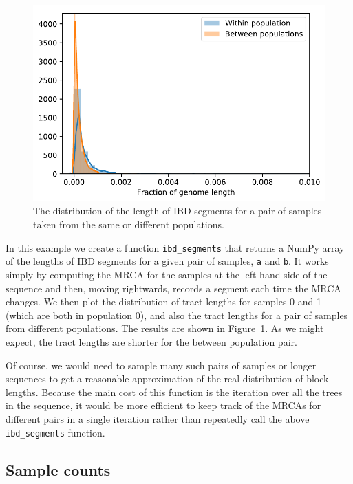 \documentclass[graybox]{svmult}
\begin{document}
\begin{figure}
\begin{center}
\includegraphics[width=\textwidth]{images/plot_12.pdf}
\end{center}
\caption{\label{fig:ibd_segments} The distribution of the length of IBD
segments for a pair of samples taken from the same or different populations.}
\end{figure}

In this example we create a function \texttt{ibd\_segments} that returns
a NumPy array of the lengths of IBD segments for a given pair of
samples, \texttt{a} and \texttt{b}. It works simply by computing the
MRCA for the samples at the left hand side of the sequence and then,
moving rightwards, records a segment each time the MRCA changes. We then
plot the distribution of tract lengths for samples 0 and 1 (which are
both in population 0), and also the tract lengths for a pair of
samples from different populations. The results are shown in
Figure~\ref{fig:ibd_segments}. As we might expect, the tract
lengths are shorter for the between population pair.

Of course, we would need to sample many such pairs of samples or longer sequences to get a reasonable approximation of the real distribution of block lengths.
Because the main cost of this function is the iteration over all the
trees in the sequence, it would be more efficient to keep track of the MRCAs
for different pairs in a single iteration rather than repeatedly
call the above \texttt{ibd\_segments} function.

\subsection{Sample counts}\label{sample-counts}
\end{document}
